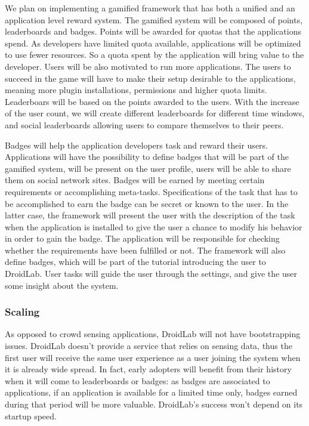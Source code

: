 \documentclass[conference,letterpaper]{IEEEtran}
\begin{document}
We plan on implementing a gamified framework  that has both a unified and an application level reward system. The gamified system will be composed of points, leaderboards and badges. Points will be awarded for quotas that the applications spend. As developers have limited quota available, applications will be optimized to use fewer resources. So a quota spent by the application will bring value to the developer. Users will be also motivated to run more applications. The users to succeed in the game will have to make their setup desirable to the applications, meaning more plugin installations, permissions and higher quota limits. Leaderboars will be based on the points awarded to the users. With the increase of the user count, we will create different leaderboards for different time windows, and social leaderboards allowing users to compare themselves to their peers.

Badges will help the application developers task and reward their users. Applications will have the possibility to define badges that will be part of the gamified system, will be present on the user profile, users will be able to share them on social network sites. Badges will be earned by meeting certain requirements or accomplishing meta-tasks. Specifications of the task that has to be accomplished to earn the badge can be secret or known to the user. In the latter case, the framework will present the user with the description of the task when the application is installed to give the user a chance to modify his behavior in order to gain the badge. The application will be responsible for checking whether the requirements have been fulfilled or not. The framework will also define badges, which will be part of the tutorial introducing the user to DroidLab. User tasks will guide the user through the settings, and give the user some insight about the system.

\subsubsection{Scaling}
As opposed to crowd sensing applications, DroidLab will not have bootstrapping issues. DroidLab doesn't provide a service that relies on sensing data, thus the first user will receive the same user experience as a user joining the system when it is already wide spread. In fact, early adopters will benefit from their history when it will come to leaderboards or badges: as badges are associated to applications, if an application is available for a limited time only, badges earned during that period will be more valuable. DroidLab's success won't depend on its startup speed.
\end{document}
